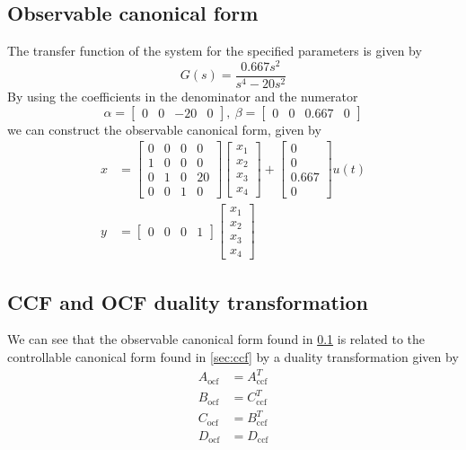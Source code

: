 \documentclass[12pt]{article}
\numberwithin{equation}{section}
\begin{document}
\subsection{Observable canonical form}
\label{sec:ocf}
The transfer function of the system for the specified parameters is given by
\begin{equation}
    G(s) = \frac{0.667 s^2}{s^4 - 20 s^2}
\end{equation}
By using the coefficients in the denominator and the numerator
\begin{equation}
    \alpha
    =
    \begin{bmatrix}
        0 & 0 & -20 & 0 
    \end{bmatrix}
    ,\ 
    \beta
    =
    \begin{bmatrix}
        0 & 0 & 0.667 & 0 
    \end{bmatrix}
\end{equation}
we can construct the observable canonical form, given by
\begin{align}
        x
    &=
    \begin{bmatrix}
        0 & 0 & 0 & 0\\
        1 & 0 & 0 & 0\\
        0 & 1 & 0 & 20\\
        0 & 0 & 1 & 0
    \end{bmatrix}
    \begin{bmatrix}
        x_1\\
        x_2\\
        x_3\\
        x_4
    \end{bmatrix}
    +
    \begin{bmatrix}
        0\\
        0\\
        0.667\\
        0
    \end{bmatrix}
    u(t)\\
    y
    &=
    \begin{bmatrix}
        0 & 0 & 0 & 1
    \end{bmatrix}
    \begin{bmatrix}
        x_1\\
        x_2\\
        x_3\\
        x_4
    \end{bmatrix}
\end{align}

\subsection{CCF and OCF duality transformation}
We can see that the observable canonical form found in \ref{sec:ocf} is related to the controllable canonical form found in \ref{sec:ccf} by a duality transformation given by
\begin{align}
    A_\text{ocf} &= A_\text{ccf}^T\\
    B_\text{ocf} &= C_\text{ccf}^T\\
    C_\text{ocf} &= B_\text{ccf}^T\\
    D_\text{ocf} &= D_\text{ccf}
\end{align}
\end{document}
